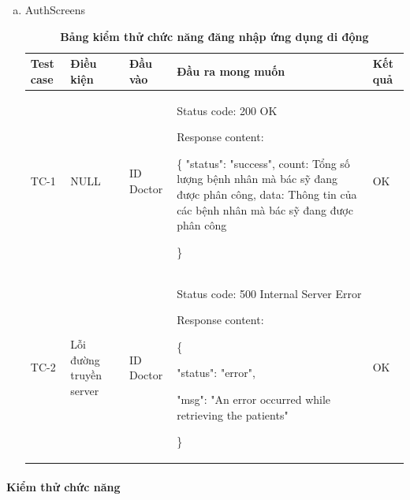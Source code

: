 \begin{enumerate}[a)]
  \item AuthScreens
  \begin{xltabular}{\textwidth}{
    | >{\raggedright\arraybackslash}m{1cm}
    | >{\raggedright\arraybackslash}X
    | >{\raggedright\arraybackslash}X
    | >{\raggedright\arraybackslash}X
    | >{\raggedright\arraybackslash}m{1cm}|
    }
    \caption{\bfseries \fontsize{12pt}{0pt}\selectfont Bảng kiểm thử chức năng đăng nhập ứng dụng di động}
    \\
    \hline
    \bfseries Test case    &\bfseries Điều kiện   &\bfseries Đầu vào 
    &\bfseries Đầu ra mong muốn &\bfseries Kết quả\\ \hline
  
  
    TC-1 & NULL & ID Doctor & 
      Status code: 200 OK
    
        Response content:
    
        \{
      "status": "success",
      count: Tổng số lượng bệnh nhân mà bác sỹ đang được phân công,
      data: Thông tin của các bệnh nhân mà bác sỹ đang được phân công
    
      \}
    & OK
  
    \\ \hline
  
    TC-2
    & Lỗi đường truyền server
    & ID Doctor

   &
  
    Status code: 500 Internal Server Error
  
      Response content:
  
      \{
  
    "status": "error",
  
    "msg": "An error occurred while retrieving the patients"
  
    \}
    
    & OK
  
    \\ \hline

  
    \end{xltabular}
\end{enumerate}

\paragraph{Kiểm thử chức năng}
\mbox{}


\newpage
